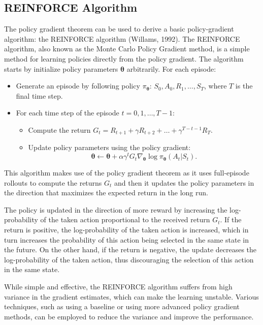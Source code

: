 \subsection{REINFORCE Algorithm}
The policy gradient theorem can be used to derive a basic policy-gradient algorithm: the REINFORCE algorithm (Willams, 1992). The REINFORCE algorithm, also known as the Monte Carlo Policy Gradient method, is a simple method for learning policies directly from the policy gradient. 
The algorithm starts by initialize policy parameters $\boldsymbol{\theta}$ arbitrarily. For each episode:
    \begin{itemize}
        \item Generate an episode by following policy $\pi_{\boldsymbol{\theta}}$: $S_0, A_0, R_1, \ldots, S_T$, where $T$ is the final time step.
        \item For each time step of the episode $t = 0, 1, \ldots, T-1$:
            \begin{itemize}
                \item Compute the return $G_t = R_{t+1} + \gamma R_{t+2} + \ldots + \gamma^{T-t-1} R_T$.
                \item Update policy parameters using the policy gradient:
                \[
                    \boldsymbol{\theta} \leftarrow \boldsymbol{\theta} + \alpha \gamma^{t} G_t \nabla_{\boldsymbol{\theta}} \log \pi_{\boldsymbol{\theta}}(A_t|S_t).
                \]
            \end{itemize}
    \end{itemize}
This algorithm makes use of the policy gradient theorem as it uses full-episode rollouts to compute the returns $G_t$ and then it updates the policy parameters in the direction that maximizes the expected return in the long run.

The policy is updated in the direction of more reward by increasing the log-probability of the taken action proportional to the received return $G_t$. If the return is positive, the log-probability of the taken action is increased, which in turn increases the probability of this action being selected in the same state in the future. On the other hand, if the return is negative, the update decreases the log-probability of the taken action, thus discouraging the selection of this action in the same state.

While simple and effective, the REINFORCE algorithm suffers from high variance in the gradient estimates, which can make the learning unstable. Various techniques, such as using a baseline or using more advanced policy gradient methods, can be employed to reduce the variance and improve the performance.


